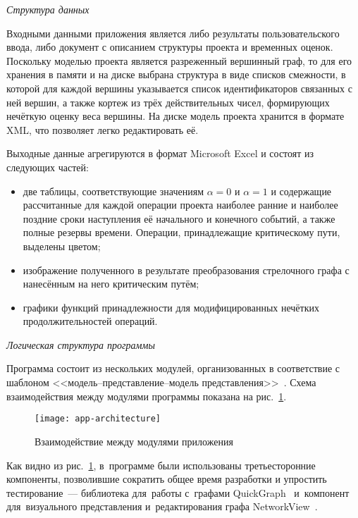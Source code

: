 \textit{Структура данных}

Входными данными приложения является либо результаты пользовательского ввода, либо документ с описанием структуры проекта и временных оценок. Поскольку моделью проекта является разреженный вершинный граф, то для его хранения в памяти и на диске выбрана структура в виде списков смежности, в которой для каждой вершины указывается список идентификаторов связанных с ней вершин, а также кортеж из трёх действительных чисел, формирующих нечёткую оценку веса вершины. На диске модель проекта хранится в формате XML, что позволяет легко редактировать её.

Выходные данные агрегируются в формат Microsoft Excel и состоят из следующих частей:
\begin{itemize}
  \item две таблицы, соответствующие значениям $\alpha=0$ и $\alpha=1$ и содержащие рассчитанные для каждой операции проекта наиболее ранние и наиболее поздние сроки наступления её начального и конечного событий, а также полные резервы времени. Операции, принадлежащие критическому пути, выделены цветом;
  \item изображение полученного в результате преобразования стрелочного графа с нанесённым на него критическим путём;
  \item графики функций принадлежности для модифицированных нечётких продолжительностей операций.
\end{itemize}

\textit{Логическая структура программы}

Программа состоит из нескольких модулей, организованных в соответствие с шаблоном <<модель--представление--модель представления>>~\cite{NetworkView_CodeProject}. Схема взаимодействия между модулями программы показана на рис.~\ref{fig:app-architecture}.
\begin{figure}[b!]
  \centering
  {
    \texttt{[image: app-architecture]}
  }
  \caption{Взаимодействие между модулями приложения}
  \label{fig:app-architecture}
\end{figure}

Как видно из рис.~\ref{fig:app-architecture}, в~программе были использованы третьесторонние компоненты, позволившие сократить общее время разработки и упростить тестирование~--- библиотека для~работы с~графами QuickGraph~\cite{QuickGraph_Codeplex, QuickGraph_CodeProject} и~компонент для~визуального представления и~редактирования графа NetworkView~\cite{NetworkView_CodeProject}.

